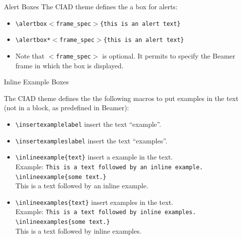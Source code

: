\documentclass[english,sectioncirclenumberstyle]{ciadbeamer}
\begin{document}
\begin{frame}{Alert Boxes}
	The CIAD theme defines the a box for alerts: \\
	\begin{itemize}
	\item \texttt{{\textbackslash}alertbox\ensuremath{<}frame\_spec\ensuremath{>}\{this is an alert text\}} \\[.5cm]
		\vspace{1cm}
	\item \texttt{{\textbackslash}alertbox*\ensuremath{<}frame\_spec\ensuremath{>}\{this is an alert text\}} \\[.5cm]
	\item Note that \texttt{\ensuremath{<}frame\_spec\ensuremath{>}} is optional. It permits to specify the Beamer frame in which the box is displayed.
	\end{itemize}
\end{frame}

\begin{frame}{Inline Example Boxes}
	\begin{small}
	The CIAD theme defines the the following macros to put examples in the text (not in a block, as predefined in Beamer):
	\begin{itemize}
	\item \texttt{{\textbackslash}insertexamplelabel} insert the text ``example''.
	\item \texttt{{\textbackslash}insertexampleslabel} insert the text ``examples''.
	\vspace{1em}
	\item \texttt{{\textbackslash}inlineexample\{text\}} insert a example in the text. \\
		Example: \texttt{This is a text followed by an inline example. {\textbackslash}inlineexample\{some text.\}} \\
		This is a text followed by an inline example. 
	\item \texttt{{\textbackslash}inlineexamples\{text\}} insert examples in the text. \\
		Example: \texttt{This is a text followed by inline examples. {\textbackslash}inlineexamples\{some text.\}} \\
		This is a text followed by inline examples. 
	\end{itemize}
	\end{small}
\end{frame}
\end{document}
